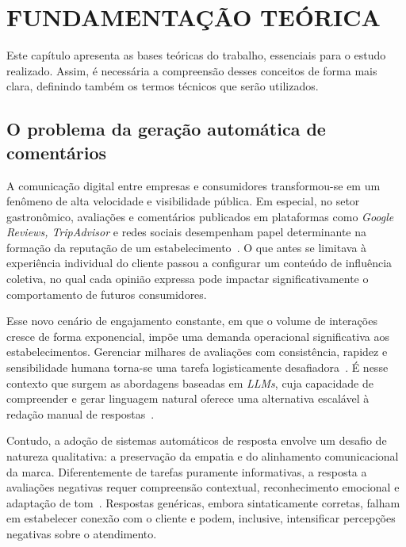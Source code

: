 \documentclass[12pt, a4paper]{article}
\numberwithin{equation}{section}
\begin{document}
\section{FUNDAMENTAÇÃO TEÓRICA}

Este capítulo apresenta as bases teóricas do trabalho, essenciais para o estudo realizado. Assim, é necessária a compreensão desses conceitos de forma mais clara, definindo também os termos técnicos que serão utilizados.

\subsection{O problema da geração automática de comentários}

A comunicação digital entre empresas e consumidores transformou-se em um fenômeno de alta velocidade e visibilidade pública. Em especial, no setor gastronômico, avaliações e comentários publicados em plataformas como \textit{Google Reviews, TripAdvisor} e redes sociais desempenham papel determinante na formação da reputação de um estabelecimento~\cite{silva2019Effect}. O que antes se limitava à experiência individual do cliente passou a configurar um conteúdo de influência coletiva, no qual cada opinião expressa pode impactar significativamente o comportamento de futuros consumidores.

Esse novo cenário de engajamento constante, em que o volume de interações cresce de forma exponencial, impõe uma demanda operacional significativa aos estabelecimentos. Gerenciar milhares de avaliações com consistência, rapidez e sensibilidade humana torna-se uma tarefa logisticamente desafiadora~\cite{lee2018Structural}. É nesse contexto que surgem as abordagens baseadas em \textit{LLMs}, cuja capacidade de compreender e gerar linguagem natural oferece uma alternativa escalável à redação manual de respostas~\cite{gamboa2023Chatbots, araujo2024Explorando}.

Contudo, a adoção de sistemas automáticos de resposta envolve um desafio de natureza qualitativa: a preservação da empatia e do alinhamento comunicacional da marca. Diferentemente de tarefas puramente informativas, a resposta a avaliações negativas requer compreensão contextual, reconhecimento emocional e adaptação de tom~\cite{crolic2023Blame}. Respostas genéricas, embora sintaticamente corretas, falham em estabelecer conexão com o cliente e podem, inclusive, intensificar percepções negativas sobre o atendimento.
\end{document}
